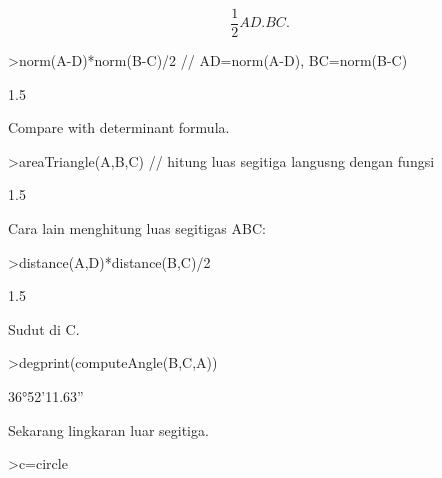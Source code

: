 \documentclass[a4paper,10pt]{article}
\begin{document}
\begin{eulernotebook}
\begin{eulercomment}
\begin{eulercomment}
\begin{eulercomment}
\begin{eulercomment}
\begin{eulercomment}
\begin{eulercomment}
\begin{eulercomment}
\begin{eulercomment}
\begin{eulercomment}
\begin{eulercomment}
\begin{eulercomment}
\begin{eulercomment}
\begin{eulercomment}
\begin{eulercomment}
\begin{eulercomment}
\begin{eulercomment}
\begin{eulercomment}
\begin{eulercomment}
\begin{eulercomment}
\begin{eulercomment}
\begin{eulercomment}
\begin{eulercomment}
\begin{eulercomment}
\begin{eulercomment}
\begin{eulercomment}
\begin{eulercomment}
\begin{eulercomment}
\begin{eulercomment}
\begin{eulercomment}
\begin{eulercomment}
\begin{eulercomment}
\begin{eulercomment}
\begin{eulercomment}
\begin{eulercomment}
\begin{eulercomment}
\begin{eulercomment}
\begin{eulercomment}
\begin{eulercomment}
\begin{eulercomment}
\begin{eulercomment}
\begin{eulercomment}
\begin{eulercomment}
\begin{eulercomment}
\begin{eulercomment}
\begin{eulercomment}
\begin{eulercomment}
\begin{eulercomment}
\begin{eulercomment}
\begin{eulercomment}
\begin{eulercomment}
\begin{eulercomment}
\begin{eulercomment}
\begin{eulercomment}
\begin{eulercomment}
\begin{eulercomment}
\begin{eulercomment}
\begin{eulercomment}
\begin{eulercomment}
\begin{eulercomment}
\begin{eulercomment}
\begin{eulercomment}
\begin{eulercomment}
\begin{eulerformula}
\[\frac{1}{2}AD.BC.
\]
\end{eulerformula}
\begin{eulerprompt}
>norm(A-D)*norm(B-C)/2 // AD=norm(A-D), BC=norm(B-C)
\end{eulerprompt}
\begin{euleroutput}
  1.5
\end{euleroutput}
\begin{eulercomment}
Compare with determinant formula.
\end{eulercomment}
\begin{eulerprompt}
>areaTriangle(A,B,C) // hitung luas segitiga langusng dengan fungsi
\end{eulerprompt}
\begin{euleroutput}
  1.5
\end{euleroutput}
\begin{eulercomment}
Cara lain menghitung luas segitigas ABC:
\end{eulercomment}
\begin{eulerprompt}
>distance(A,D)*distance(B,C)/2
\end{eulerprompt}
\begin{euleroutput}
  1.5
\end{euleroutput}
\begin{eulercomment}
Sudut di C.
\end{eulercomment}
\begin{eulerprompt}
>degprint(computeAngle(B,C,A))
\end{eulerprompt}
\begin{euleroutput}
  36°52'11.63''
\end{euleroutput}
\begin{eulercomment}
Sekarang lingkaran luar segitiga.
\end{eulercomment}
\begin{eulerprompt}
>c=circle
\end{eulerprompt}
\end{eulercomment}
\end{eulercomment}
\end{eulercomment}
\end{eulercomment}
\end{eulercomment}
\end{eulercomment}
\end{eulercomment}
\end{eulercomment}
\end{eulercomment}
\end{eulercomment}
\end{eulercomment}
\end{eulercomment}
\end{eulercomment}
\end{eulercomment}
\end{eulercomment}
\end{eulercomment}
\end{eulercomment}
\end{eulercomment}
\end{eulercomment}
\end{eulercomment}
\end{eulercomment}
\end{eulercomment}
\end{eulercomment}
\end{eulercomment}
\end{eulercomment}
\end{eulercomment}
\end{eulercomment}
\end{eulercomment}
\end{eulercomment}
\end{eulercomment}
\end{eulercomment}
\end{eulercomment}
\end{eulercomment}
\end{eulercomment}
\end{eulercomment}
\end{eulercomment}
\end{eulercomment}
\end{eulercomment}
\end{eulercomment}
\end{eulercomment}
\end{eulercomment}
\end{eulercomment}
\end{eulercomment}
\end{eulercomment}
\end{eulercomment}
\end{eulercomment}
\end{eulercomment}
\end{eulercomment}
\end{eulercomment}
\end{eulercomment}
\end{eulercomment}
\end{eulercomment}
\end{eulercomment}
\end{eulercomment}
\end{eulercomment}
\end{eulercomment}
\end{eulercomment}
\end{eulercomment}
\end{eulercomment}
\end{eulercomment}
\end{eulercomment}
\end{eulercomment}
\end{eulernotebook}
\end{document}
